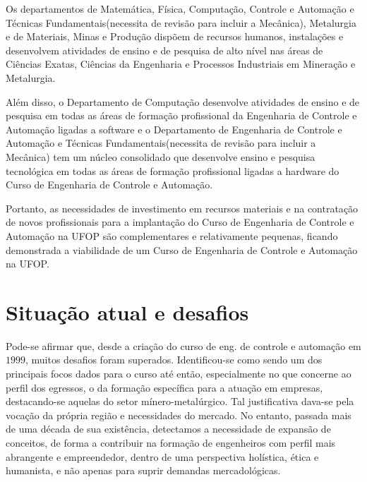 Os departamentos de Matem{\'a}tica, F{\'i}sica, Computa{\c c}{\~a}o, Controle e Automa{\c c}{\~a}o e T{\'e}cnicas Fundamentais(necessita de revis{\~a}o para incluir a Mec{\^a}nica), Metalurgia e de Materiais, Minas e Produ{\c c}{\~a}o disp{\~o}em de recursos humanos, instala{\c c}{\~o}es e desenvolvem atividades de ensino e de pesquisa de alto n{\'i}vel nas {\'a}reas de Ci{\^e}ncias Exatas, Ci{\^e}ncias da Engenharia e Processos Industriais em Minera{\c c}{\~a}o e Metalurgia. 

Al{\'e}m disso, o Departamento de Computa{\c c}{\~a}o desenvolve atividades de ensino e de pesquisa em todas as {\'a}reas de forma{\c c}{\~a}o profissional da Engenharia de Controle e Automa{\c c}{\~a}o ligadas a software e o Departamento de Engenharia de Controle e Automa{\c c}{\~a}o e T{\'e}cnicas Fundamentais(necessita de revis{\~a}o para incluir a Mec{\^a}nica) tem um núcleo consolidado que desenvolve ensino e pesquisa tecnológica em todas as {\'a}reas de forma{\c c}{\~a}o profissional ligadas a hardware do Curso de Engenharia de Controle e Automa{\c c}{\~a}o.

Portanto, as necessidades de investimento em recursos materiais e na contrata{\c c}{\~a}o de novos profissionais para a implanta{\c c}{\~a}o do Curso de Engenharia de Controle e Automa{\c c}{\~a}o na UFOP s{\~a}o complementares e relativamente pequenas, ficando demonstrada a viabilidade de um Curso de Engenharia de Controle e Automa{\c c}{\~a}o na UFOP.
 

\section{Situa{\c c}{\~a}o atual e desafios}

Pode-se afirmar que, desde a cria{\c c}{\~a}o do curso de eng. de controle e automa{\c c}{\~a}o em $1999$, muitos desafios foram superados. Identificou-se como sendo um dos principais focos dados para o curso at{\'e} ent{\~a}o, especialmente no que concerne ao perfil dos egressos, o da forma{\c c}{\~a}o espec{\'i}fica para a atua{\c c}{\~a}o em empresas, destacando-se aquelas do setor m{\'i}nero-metal{\'u}rgico. Tal justificativa dava-se pela voca{\c c}{\~a}o da pr{\'o}pria regi{\~a}o e necessidades do mercado. No entanto, passada mais de uma d{\'e}cada de sua exist{\^e}ncia, detectamos a necessidade de expans{\~a}o de conceitos, de forma a contribuir na forma{\c c}{\~a}o de engenheiros com perfil mais abrangente e empreendedor, dentro de uma perspectiva hol{\'i}stica, {\'e}tica e humanista, e n{\~a}o apenas para suprir demandas mercadol{\'o}gicas.




